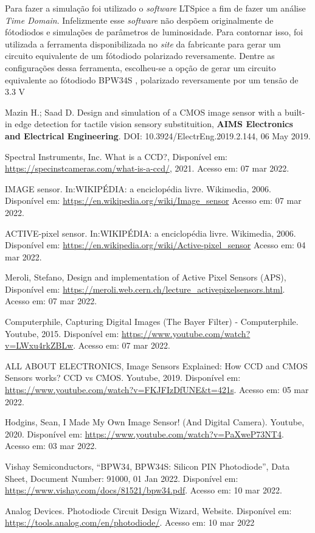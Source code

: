 \documentclass[10pt,a4paper,twocolumn]{article}
\begin{document}
	Para fazer a simulação foi utilizado o \textit{software} LTSpice a fim de fazer um análise \textit{Time Domain}. Infelizmente esse \textit{software} não despõem originalmente de fótodiodos e simulações de parâmetros de luminosidade. Para contornar isso, foi utilizada a ferramenta \cite{photodiode} disponibilizada no \textit{site} da fabricante para gerar um circuito equivalente de um fótodiodo polarizado reversamente. Dentre as configurações dessa ferramenta, escolheu-se a opção de gerar um circuito equivalente ao fótodiodo BPW34S \cite{BPW34}, polarizado reversamente por um tensão de 3.3 V
	
	\begin{thebibliography}{99}
		{Mazin H.; Saad D. {Design and simulation of a CMOS image sensor with a built-in edge detection for tactile vision sensory substituition}, \textbf{AIMS Electronics and Electrical Engineering}. DOI: 10.3924/ElectrEng.2019.2.144, 06 May 2019.}
		
		{Spectral Instruments, Inc. {What is a CCD?}, Disponível em: \url{https://specinstcameras.com/what-is-a-ccd/}, 2021. Acesso em: 07 mar 2022.}
		
		{IMAGE sensor. In:WIKIPÉDIA: a enciclopédia livre. Wikimedia, 2006. Disponível em: \url{https://en.wikipedia.org/wiki/Image_sensor} Acesso em: 07 mar 2022.}

		{ACTIVE-pixel sensor. In:WIKIPÉDIA: a enciclopédia livre. Wikimedia, 2006. Disponível em: \url{https://en.wikipedia.org/wiki/Active-pixel_sensor} Acesso em: 04 mar 2022.}
		
		{Meroli, Stefano, {Design and implementation of Active Pixel Sensors (APS)}, Disponível em: \url{https://meroli.web.cern.ch/lecture_activepixelsensors.html}. Acesso em: 07 mar 2022.}
		
		{Computerphile, {Capturing Digital Images (The Bayer Filter) - Computerphile}. Youtube, 2015. Disponível em: \url{https://www.youtube.com/watch?v=LWxu4rkZBLw}. Acesso em: 07 mar 2022.}
		
		{ALL ABOUT ELECTRONICS, {Image Sensors Explained: How CCD and CMOS Sensors works? CCD vs CMOS}. Youtube, 2019. Disponível em: \url{https://www.youtube.com/watch?v=FKJFIzDfUNE&t=421s}. Acesso em: 05 mar 2022.}
		
		{Hodgins, Sean, {I Made My Own Image Sensor! (And Digital Camera)}. Youtube, 2020. Disponível em: \url{https://www.youtube.com/watch?v=PaXweP73NT4}. Acesso em: 03 mar 2022.}
		
		{Vishay Semiconductors, {``BPW34, BPW34S: Silicon PIN Photodiode''}, Data Sheet, Document Number: 91000, 01 Jan 2022. Disponível em: \url{https://www.vishay.com/docs/81521/bpw34.pdf}. Acesso em: 10 mar 2022.}
		
		{Analog Devices. {Photodiode Circuit Design Wizard}, Website. Disponível em: \url{https://tools.analog.com/en/photodiode/}. Acesso em: 10 mar 2022}

	\end{thebibliography}
\end{document}
